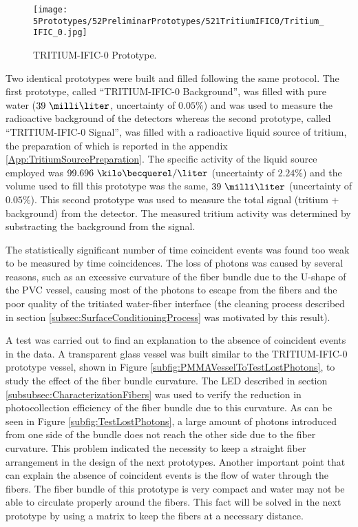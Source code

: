 \begin{figure}[h]
\centering
\texttt{[image: 5Prototypes/52PreliminarPrototypes/521TritiumIFIC0/Tritium\_IFIC\_0.jpg]}
\caption{TRITIUM-IFIC-0 Prototype.\label{fig:TritiumIFIC0}}
\end{figure}

Two identical prototypes were built and filled following the same protocol. The first prototype, called ``TRITIUM-IFIC-0 Background'', was filled with pure water ($39~\milli\liter$, uncertainty of $0.05\%$) and was used to measure the radioactive background of the detectors whereas the second prototype, called ``TRITIUM-IFIC-0 Signal'', was filled with a radioactive liquid source of tritium, the preparation of which is reported in the appendix \ref{App:TritiumSourcePreparation}. The specific activity of the liquid source employed was $99.696~\kilo\becquerel/\liter$ (uncertainty of $2.24\%$) and the volume used to fill this prototype was the same, $39~\milli\liter$ (uncertainty of $0.05\%$). This second prototype was used to measure the total signal (tritium + background) from the detector. The measured tritium activity was determined by substracting the background from the signal. 

The statistically significant number of time coincident events was found too weak to be measured by time coincidences. The loss of photons was caused by several reasons, such as an excessive curvature of the fiber bundle due to the U-shape of the PVC vessel, causing most of the photons to escape from the fibers and the poor quality of the tritiated water-fiber interface (the cleaning process described in section \ref{subsec:SurfaceConditioningProcess} was motivated by this result). 

A test was carried out to find an explanation to the absence of coincident events in the data. A transparent glass vessel was built similar to the TRITIUM-IFIC-0 prototype vessel, shown in Figure \ref{subfig:PMMAVesselToTestLostPhotons}, to study the effect of the fiber bundle curvature. The LED described in section \ref{subsubsec:CharacterizationFibers} was used to verify the reduction in photocollection efficiency of the fiber bundle due to this curvature. As can be seen in Figure \ref{subfig:TestLostPhotons}, a large amount of photons introduced from one side of the bundle does not reach the other side due to the fiber curvature. This problem indicated the necessity to keep a straight fiber arrangement in the design of the next prototypes. Another important point that can explain the absence of coincident events is the flow of water through the fibers. The fiber bundle of this prototype is very compact and water may not be able to circulate properly around the fibers. This fact will be solved in the next prototype by using a matrix to keep the fibers at a necessary distance.


